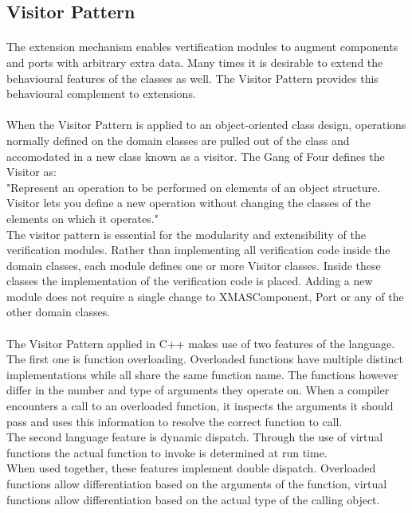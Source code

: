 \documentclass[a4paper,11pt]{article}
\begin{document}
\subsection{Visitor Pattern}

\paragraph{}
The extension mechanism enables vertification modules to augment components and ports with
arbitrary extra data. Many times it is desirable to extend the behavioural features of the
classes as well. The Visitor Pattern provides this behavioural complement to extensions.

\paragraph{}
When the Visitor Pattern is applied to an object-oriented class design, operations normally
defined on the domain classes are pulled out of the class and accomodated in a new class
known as a visitor. The Gang of Four defines the Visitor as:\\"Represent an operation to be
performed on elements of an object structure. Visitor lets you define a new operation without
changing the classes of the elements on which it operates."\cite{wiki-visitor-pattern}\\
The visitor pattern is essential for the modularity and extensibility of the verification
modules. Rather than implementing all verification code inside the domain classes, each
module defines one or more Visitor classes. Inside these classes the implementation of
the verification code is placed. Adding a new module does not require a single change to
XMASComponent, Port or any of the other domain classes.

\paragraph{}
The Visitor Pattern applied in C++ makes use of two features of the language. The first one
is function overloading. Overloaded functions have multiple distinct implementations while
all share the same function name. The functions however differ in the number and type
of arguments they operate on. When a compiler encounters a call to an overloaded function,
it inspects the arguments it should pass and uses this information to resolve the correct
function to call.\\
The second language feature is dynamic dispatch. Through the use of virtual functions the
actual function to invoke is determined at run time.\\
When used together, these features implement double dispatch. Overloaded functions allow
differentiation based on the arguments of the function, virtual functions allow differentiation
based on the actual type of the calling object.
\nocite{stroustrup}
\end{document}
